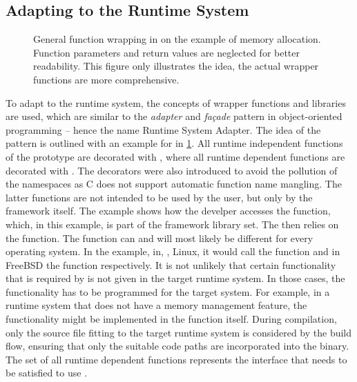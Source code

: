 \subsection{Adapting \cobas{} to the Runtime System}%
\label{sec:impl:adapt:cobas}

\begin{figure}[t!]\centering
	\caption[General function wrapping in \cobas{}]{General function wrapping in \cobas{} on the example of memory allocation. Function parameters and return values are neglected for better readability. This figure only illustrates the idea, the actual wrapper functions are more comprehensive.}%
	\label{fig:impl:wrapping}
\end{figure}

To adapt \cobas{} to the runtime system, the concepts of wrapper functions and libraries are used, which are similar to the \emph{adapter} and \emph{façade} pattern in object-oriented programming -- hence the name Runtime System Adapter. The idea of the pattern is outlined with an example for \cobas{} in \cref{fig:impl:wrapping}. All runtime independent functions of the \cobas{} prototype are decorated with , where all runtime dependent functions are decorated with . The decorators were also introduced to avoid the pollution of the namespaces as C does not support automatic function name mangling. The latter functions are not intended to be used by the \cobas{} user, but only by the framework itself. The example shows how the develper accesses the  function, which, in this example, is part of the framework library set. The  then relies on the  function. The  function can and will most likely be different for every operating system. In the example, in, \eg{}, Linux, it would call the  function and in FreeBSD the  function respectively. It is not unlikely that certain functionality that is required by \cobas{} is not given in the target runtime system. In those cases, the functionality has to be programmed for the target system. For example, in a runtime system that does not have a memory management feature, the functionality might be implemented in the  function itself. During compilation, only the source file fitting to the target runtime system is considered by the build flow, ensuring that only the suitable code paths are incorporated into the binary. The set of all runtime dependent functions represents the interface that needs to be satisfied to use \cobas{}.

